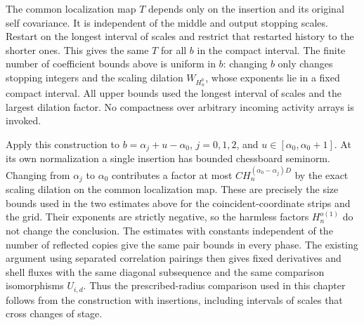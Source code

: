 The common localization map $T$ depends only on the insertion
and its original self covariance. It is independent of the middle
and output stopping scales. Restart on the longest interval of scales and restrict
that restarted history to the shorter ones. This gives the same $T$ for all
$b$ in the compact interval. The finite number of coefficient bounds
above is uniform in $b$: changing $b$ only changes stopping integers
and the scaling dilation $W_{H_n^b}$, whose exponents lie in a
fixed compact interval. All upper bounds used the longest interval of scales and
the largest dilation factor. No compactness over arbitrary incoming
activity arrays is invoked.

Apply this construction to
$b=\alpha_j+u-\alpha_0$, $j=0,1,2$, and
$u\in[\alpha_0,\alpha_0+1]$.
At its own normalization a single insertion has bounded chessboard seminorm.
Changing from $\alpha_j$ to $\alpha_0$ contributes a factor at most
$CH_n^{(\alpha_0-\alpha_j)D}$ by the exact scaling dilation on
the common localization map. These are precisely the size bounds used
in the two estimates above for the coincident-coordinate strips and the grid. Their exponents are
strictly negative, so the harmless factors $H_n^{o(1)}$ do not change
the conclusion. The estimates with constants independent of the number of reflected copies give the same pair bounds
in every phase. The existing argument using separated correlation pairings then gives
fixed derivatives and shell fluxes with the same diagonal subsequence and the same comparison isomorphisms $U_{i,d}$.
Thus the prescribed-radius comparison used in this chapter follows
from the construction with insertions, including intervals of scales that cross
changes of stage.
